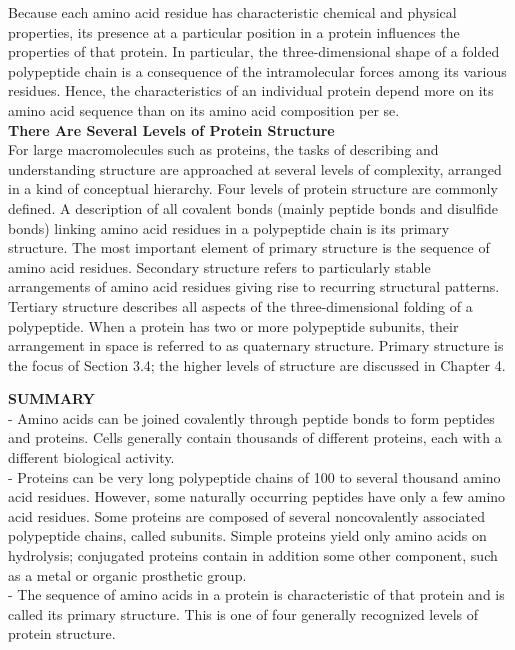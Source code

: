 Because each amino acid residue has characteristic chemical and physical properties, its presence at a particular position in a protein influences the properties of that protein. In particular, the three-dimensional shape of a folded polypeptide chain is a consequence of the intramolecular forces among its various residues. Hence, the characteristics of an individual protein depend more on its amino acid sequence than on its amino acid composition per se.
\\
\textbf{There Are Several Levels of Protein Structure}\\
For large macromolecules such as proteins, the tasks of describing and understanding structure are approached at several levels of complexity, arranged in a kind of conceptual hierarchy. Four levels of protein structure are commonly defined. A description of all covalent bonds (mainly peptide bonds and disulfide bonds) linking amino acid residues in a polypeptide chain is its primary structure. The most important element of primary structure is the sequence of amino acid residues. Secondary structure refers to particularly stable arrangements of amino acid residues giving rise to recurring structural patterns. Tertiary structure describes all aspects of the three-dimensional folding of a polypeptide. When a protein has two or more polypeptide subunits, their arrangement in space is referred to as quaternary structure. Primary structure is the focus of Section 3.4; the higher levels of structure are discussed in Chapter 4.

\textbf{SUMMARY}\\
- Amino acids can be joined covalently through peptide bonds to form peptides and proteins. Cells generally contain thousands of different proteins, each with a different biological activity.\\
- Proteins can be very long polypeptide chains of 100 to several thousand amino acid residues. However, some naturally occurring peptides have only a few amino acid residues. Some proteins are composed of several noncovalently associated polypeptide chains, called subunits. Simple proteins yield only amino acids on hydrolysis; conjugated proteins contain in addition some other component, such as a metal or organic prosthetic group.\\
- The sequence of amino acids in a protein is characteristic of that protein and is called its primary structure. This is one of four generally recognized levels of protein structure.
\cite{nelson2008lehninger}

